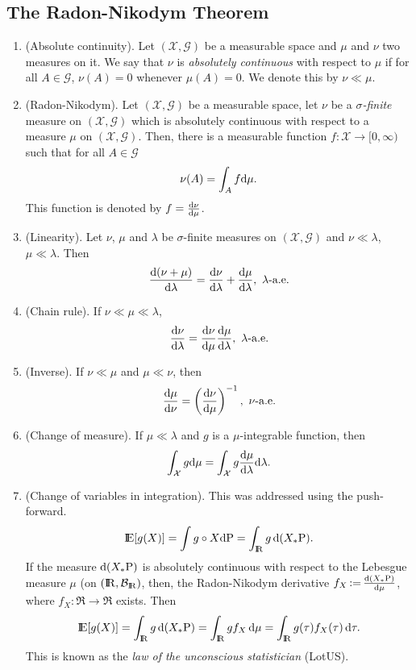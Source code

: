 \documentclass[a4paper,10pt]{scrbook}
\begin{document}
\subsection{The Radon-Nikodym Theorem}
\begin{enumerate}
 \item (Absolute continuity).
       Let $(\mathcal{X}, \mathscr{G})$ be a measurable space and $\mu$ and $\nu$ two measures on it.
       We say that $\nu$ is \textit{absolutely continuous} with respect to $\mu$ if
       for all $A\in\mathscr{G}$, $\nu(A)=0$ whenever $\mu(A)=0$. We denote this by $\nu\ll\mu$.
 \item (Radon-Nikodym). Let $(\mathcal{X}, \mathscr{G})$ be a measurable space, let $\nu$ be a \textit{$\sigma$-finite}
       measure on $(\mathcal{X}, \mathscr{G})$ which is {absolutely continuous} with respect 
       to a measure $\mu$ on $(\mathcal{X}, \mathscr{G})$. Then, there is a measurable function $f:\mathcal{X}\to[0,\infty)$
       such that for all $A\in \mathcal{G}$
       \[
        \nu(A) = \int_A f \mathrm{d} \mu.
       \]
      This function is denoted by $f=\frac{\mathrm{d}\nu}{\mathrm{d} \mu}$.
 \item (Linearity). Let $\nu$, $\mu$ and $\lambda$ be $\sigma$-finite measures on $(\mathcal{X}, \mathscr{G})$ and $\nu\ll\lambda$, $\mu\ll\lambda$.
       Then
       \[
        \frac{\d(\nu+\mu)}{\d \lambda} = \frac{\d \nu}{\d \lambda} + \frac{\d \mu}{\d \lambda},\ \lambda\text{-a.e.}
       \]
 \item (Chain rule). If $\nu\ll\mu\ll\lambda$,
 \[
  \frac{\d\nu}{\d\lambda} = \frac{\d\nu}{\d\mu} \frac{\d\mu}{\d\lambda},\ \lambda\text{-a.e.} 
 \]
 \item (Inverse). If $\nu\ll\mu$ and $\mu\ll\nu$, then
 \[
  \frac{\mathrm{d} \mu}{\mathrm{d} \nu} = \left( \frac{\mathrm{d} \nu}{\mathrm{d} \mu}\right)^{-1},\ \nu\text{-a.e.}
 \]
 \item (Change of measure).
 If $\mu\ll\lambda$ and $g$ is a $\mu$-integrable function, then
 \[
  \int_{\mathcal{X}} g \mathrm{d} \mu = \int_{\mathcal{X}} g \frac{\mathrm{d} \mu}{\mathrm{d} \lambda}\mathrm{d} \lambda.
 \]
 \item (\hypertarget{link:lotus}{Change of variables in integration}). This was addressed using the push-forward. 
 \[
  \E[g(X)] = \int g\circ X\d\prob = \int_\Re g \,\d(X_*\prob).
 \]
 If the measure $\mathrm{d}(X_*\mathrm{P})$ is absolutely continuous with respect to the Lebesgue 
 measure $\mu$ (on $(\Re, \B_\Re)$, then, the Radon-Nikodym derivative $f_X{}\mathop{\mathrel{:}=}{} \frac{\mathrm{d}(X_*\mathrm{P})}{\mathrm{d} \mu}$,
 where $f_X:\Re\to\Re$ exists. Then
 \[
  \E[g(X)] = \int_\Re g\, \d(X_*\prob) = \int_\Re g f_X\, \d\mu = \int_\Re g(\tau)f_X(\tau)\,\d \tau.
 \]
 This is known as the \textit{law of the unconscious statistician} (LotUS).

\end{enumerate}
\end{document}
